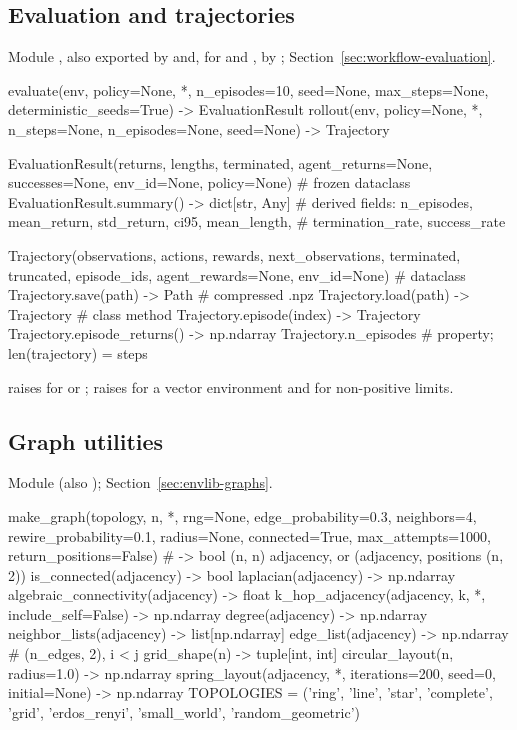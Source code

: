 \subsection{Evaluation and trajectories}

Module , also exported by 
and, for  and , by ;
Section~\ref{sec:workflow-evaluation}.

\begin{pycode}
evaluate(env, policy=None, *, n_episodes=10, seed=None, max_steps=None,
         deterministic_seeds=True) -> EvaluationResult
rollout(env, policy=None, *, n_steps=None, n_episodes=None,
        seed=None) -> Trajectory

EvaluationResult(returns, lengths, terminated, agent_returns=None,
                 successes=None, env_id=None, policy=None)   # frozen dataclass
EvaluationResult.summary() -> dict[str, Any]
    # derived fields: n_episodes, mean_return, std_return, ci95, mean_length,
    #                 termination_rate, success_rate

Trajectory(observations, actions, rewards, next_observations, terminated,
           truncated, episode_ids, agent_rewards=None, env_id=None)  # dataclass
Trajectory.save(path) -> Path             # compressed .npz
Trajectory.load(path) -> Trajectory       # class method
Trajectory.episode(index) -> Trajectory
Trajectory.episode_returns() -> np.ndarray
Trajectory.n_episodes                     # property; len(trajectory) = steps
\end{pycode}

 raises  for  or
;  raises  for a vector
environment and  for non-positive limits.

\subsection{Graph utilities}

Module  (also );
Section~\ref{sec:envlib-graphs}.

\begin{pycode}
make_graph(topology, n, *, rng=None, edge_probability=0.3, neighbors=4,
           rewire_probability=0.1, radius=None, connected=True,
           max_attempts=1000, return_positions=False)
    # -> bool (n, n) adjacency, or (adjacency, positions (n, 2))
is_connected(adjacency) -> bool
laplacian(adjacency) -> np.ndarray
algebraic_connectivity(adjacency) -> float
k_hop_adjacency(adjacency, k, *, include_self=False) -> np.ndarray
degree(adjacency) -> np.ndarray
neighbor_lists(adjacency) -> list[np.ndarray]
edge_list(adjacency) -> np.ndarray        # (n_edges, 2), i < j
grid_shape(n) -> tuple[int, int]
circular_layout(n, radius=1.0) -> np.ndarray
spring_layout(adjacency, *, iterations=200, seed=0,
              initial=None) -> np.ndarray
TOPOLOGIES = ('ring', 'line', 'star', 'complete', 'grid', 'erdos_renyi',
              'small_world', 'random_geometric')
\end{pycode}

